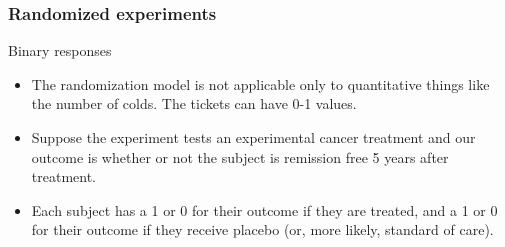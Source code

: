 \documentclass[handout]{beamer}
\begin{document}
   \begin{frame} \frametitle{Randomized experiments}

   \begin{block}
   {Binary responses}
   \begin{itemize}
   \item The randomization model is not applicable only to
   quantitative things like the number of colds. The tickets
   can have 0-1 values.

   \item Suppose the experiment tests an experimental cancer treatment
   and our outcome is whether or not the subject is remission free 5 years
   after treatment.

   \item Each subject has a {\color{green} 1 or 0} for their
   outcome if they are treated, and a {\color{red} 1 or 0} for their
   outcome if they receive placebo (or, more likely, standard of care).

   \end{itemize}
   \end{block}
   \end{frame}

\end{document}
